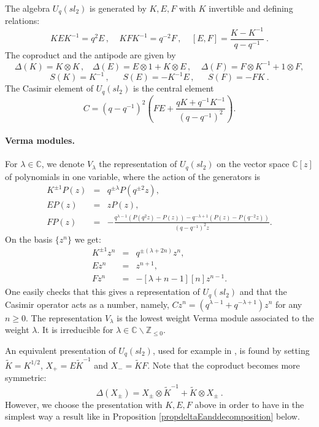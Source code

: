 \documentclass[a4paper,12pt]{article}
\numberwithin{equation}{section}
\newcommand{\C}{\mathbb{C}}
\newcommand{\Z}{\mathbb{Z}}
\theoremstyle{rem}
\newenvironment{rema}
  {\pushQED{\qed}\renewcommand{\qedsymbol}{$\scriptstyle{\blacktriangle}$}\remax}
  {\popQED\endremax}
\theoremstyle{definition}
\begin{document}
The algebra $U_q(sl_2)$ is generated by $K,E,F$ with $K$ invertible and defining relations:
\[KEK^{-1}=q^2E\,,\ \ \ \ \ KFK^{-1}=q^{-2}F\,,\ \ \ \ \ [E,F]=\frac{K-K^{-1}}{q-q^{-1}}\ .\]
The coproduct and the antipode are given by
\[\Delta(K)=K\otimes K\,,\ \ \ \ \Delta(E)=E\otimes 1 + K\otimes E\,,\ \ \ \ \ \Delta(F)=F\otimes K^{-1} + 1\otimes F,\]
\[S(K)=K^{-1}\,,\ \ \ \ \ \ \ S(E)=-K^{-1}E\,,\ \ \ \ \ \ \ S(F)=-FK\ .\]
The Casimir element of $U_q(sl_2)$ is the central element 
\begin{equation}\label{eq:Casimir}
C=(q-q^{-1})^2\left(FE+\frac{qK+q^{-1}K^{-1}}{(q-q^{-1})^2}\right).
\end{equation}

\paragraph{Verma modules.} For $\lambda\in \C$, we denote $V_{\lambda}$ the representation of $U_q(sl_2)$ on the vector space $\mathbb{C}[z]$ of polynomials in one variable, where the action of the generators is
\begin{equation}\label{Verma}
\begin{array}{rcl}
K^{\pm 1} P(z)&=&q^{\pm\lambda}P(q^{\pm 2} z),\\[0.3em]
EP(z)&=&zP(z),\\[0.3em]
FP(z)&=&\displaystyle-\frac{q^{\lambda-1}(P(q^2z)-P(z))-q^{-\lambda+1}(P(z)-P(q^{-2}z))}{(q-q^{-1})^2z}.
\end{array}
\end{equation}
On the basis $\{z^n\}$ we get:
\begin{equation}\label{repbasisformula}
\begin{array}{rcl}
K^{\pm 1} z^n&=&q^{\pm(\lambda+2n)}z^n,\\[0.3em]
E z^n &=&z^{n+1},\\[0.3em]
F z^n&= &-[\lambda+n-1][n] z^{n-1}.
\end{array}
\end{equation}
One easily checks that this gives a representation of $U_q(sl_2)$ and that the Casimir operator acts as a number, namely, $Cz^n=(q^{\lambda-1}+q^{-\lambda+1})z^n$ for any $n\geq0$. The representation $V_{\lambda}$ is the lowest weight Verma module associated to the weight $\lambda$. It is irreducible for $\lambda\in \C\backslash\Z_{\leq 0}$.

\begin{rema}
An equivalent presentation of $U_q(sl_2)$, used for example in \cite{CFGPRV,Ros}, is found by setting $\tilde{K}=K^{1/2}$, $X_+=E\tilde{K}^{-1}$ and $X_-=\tilde{K}F$. Note that the coproduct becomes more symmetric:
\[\Delta(X_{\pm})=X_{\pm}\otimes \tilde{K}^{-1} + \tilde{K}\otimes X_{\pm}\ .\]
However, we choose the presentation with $K,E,F$ above in order to have in the simplest way a result like in Proposition \ref{propdeltaEanddecomposition} below. 
\end{rema}
\end{document}
